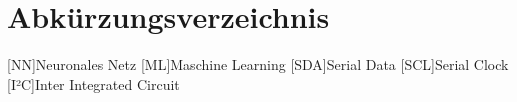 \section*{Abkürzungsverzeichnis}
\begin{acronym}
[NN]{Neuronales Netz}
[ML]{Maschine Learning}
[SDA]{Serial Data}
[SCL]{Serial Clock}
[I²C]{Inter Integrated Circuit}





\end{acronym}